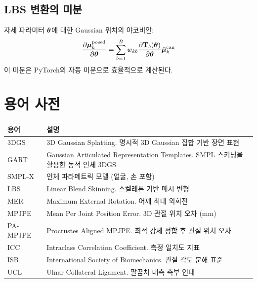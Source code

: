 \documentclass[11pt, a4paper]{report}
\begin{document}
\section{LBS 변환의 미분}

자세 파라미터 $\bm{\theta}$에 대한 Gaussian 위치의 야코비안:
\begin{equation}
  \frac{\partial \bm{\mu}_k^{\text{posed}}}{\partial \bm{\theta}} = \sum_{b=1}^{B} w_{kb} \frac{\partial \mathbf{T}_b(\bm{\theta})}{\partial \bm{\theta}} \bar{\bm{\mu}}_k^{\text{can}}
\end{equation}
이 미분은 PyTorch의 자동 미분으로 효율적으로 계산된다.


\chapter{용어 사전}

\begin{tabularx}{\textwidth}{lX}
\toprule
\textbf{용어} & \textbf{설명} \\
\midrule
3DGS & 3D Gaussian Splatting. 명시적 3D Gaussian 집합 기반 장면 표현 \\
GART & Gaussian Articulated Representation Templates. SMPL 스키닝을 활용한 동적 인체 3DGS \\
SMPL-X & 인체 파라메트릭 모델 (얼굴, 손 포함) \\
LBS & Linear Blend Skinning. 스켈레톤 기반 메시 변형 \\
MER & Maximum External Rotation. 어깨 최대 외회전 \\
MPJPE & Mean Per Joint Position Error. 3D 관절 위치 오차 (mm) \\
PA-MPJPE & Procrustes Aligned MPJPE. 최적 강체 정합 후 관절 위치 오차 \\
ICC & Intraclass Correlation Coefficient. 측정 일치도 지표 \\
ISB & International Society of Biomechanics. 관절 각도 분해 표준 \\
UCL & Ulnar Collateral Ligament. 팔꿈치 내측 측부 인대 \\
\bottomrule
\end{tabularx}
\end{document}

